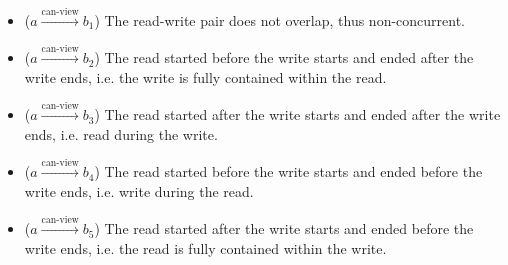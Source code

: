 \begin{itemize}
  \item ($a \xrightarrow{\text{can-view}} b_1$) The read-write pair
    does not overlap, thus non-concurrent.

  \item ($a \xrightarrow{\text{can-view}} b_2$) The read started
    before the write starts and ended after the write ends, i.e. the
    write is fully contained within the read.

  \item ($a \xrightarrow{\text{can-view}} b_3$) The read started
    after the write starts and ended after the write ends, i.e. read
    during the write.

  \item ($a \xrightarrow{\text{can-view}} b_4$) The read started
    before the write starts and ended before the write ends, i.e.
    write during the read.

  \item ($a \xrightarrow{\text{can-view}} b_5$) The read started
    after the write starts and ended before the write ends, i.e. the
    read is fully contained within the write.
\end{itemize}

